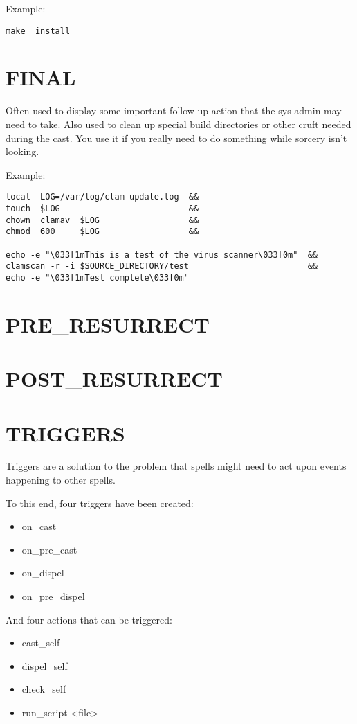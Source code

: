 \documentclass[a4paper,10pt]{book}
\begin{document}
Example:
\begin{verbatim}
make  install
\end{verbatim}


\section{FINAL}
Often used to display some important follow-up action that the sys-admin may
need to take. Also used to clean up special build directories or other cruft
needed during the cast. You use it if you really need to do something while
sorcery isn't looking.

Example:
\begin{verbatim}
local  LOG=/var/log/clam-update.log  &&
touch  $LOG                          &&
chown  clamav  $LOG                  &&
chmod  600     $LOG                  &&

echo -e "\033[1mThis is a test of the virus scanner\033[0m"  &&
clamscan -r -i $SOURCE_DIRECTORY/test                        &&
echo -e "\033[1mTest complete\033[0m"
\end{verbatim}

\section{PRE\_RESURRECT}
\section{POST\_RESURRECT}
\section{TRIGGERS}
Triggers are a solution to the problem that spells might need to act upon
events happening to other spells.

To this end, four triggers have been created:
\begin{itemize}
\item on\_cast
\item on\_pre\_cast
\item on\_dispel
\item on\_pre\_dispel
\end{itemize}

And four actions that can be triggered:
\begin{itemize}
\item cast\_self
\item dispel\_self
\item check\_self
\item run\_script <file>
\end{itemize}
\end{document}
